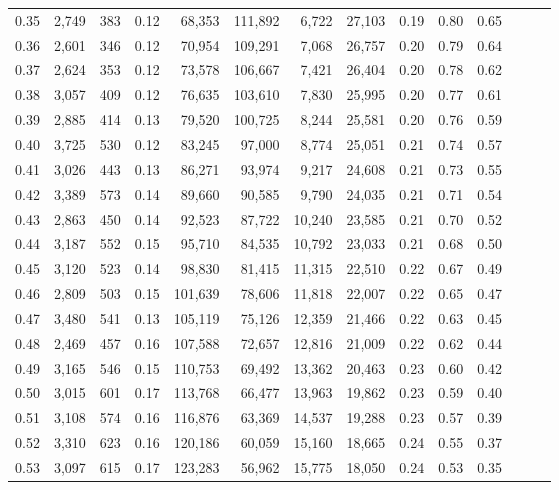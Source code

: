 \begin{tabular}{rrrrrrrrrrrrrr}
0.35 &  2,749 &  383 &  0.12 &   68,353 &  111,892 &   6,722 &  27,103 &  0.19 &  0.80 &      0.65 \\
0.36 &  2,601 &  346 &  0.12 &   70,954 &  109,291 &   7,068 &  26,757 &  0.20 &  0.79 &      0.64 \\
0.37 &  2,624 &  353 &  0.12 &   73,578 &  106,667 &   7,421 &  26,404 &  0.20 &  0.78 &      0.62 \\
0.38 &  3,057 &  409 &  0.12 &   76,635 &  103,610 &   7,830 &  25,995 &  0.20 &  0.77 &      0.61 \\
0.39 &  2,885 &  414 &  0.13 &   79,520 &  100,725 &   8,244 &  25,581 &  0.20 &  0.76 &      0.59 \\
0.40 &  3,725 &  530 &  0.12 &   83,245 &   97,000 &   8,774 &  25,051 &  0.21 &  0.74 &      0.57 \\
0.41 &  3,026 &  443 &  0.13 &   86,271 &   93,974 &   9,217 &  24,608 &  0.21 &  0.73 &      0.55 \\
0.42 &  3,389 &  573 &  0.14 &   89,660 &   90,585 &   9,790 &  24,035 &  0.21 &  0.71 &      0.54 \\
0.43 &  2,863 &  450 &  0.14 &   92,523 &   87,722 &  10,240 &  23,585 &  0.21 &  0.70 &      0.52 \\
0.44 &  3,187 &  552 &  0.15 &   95,710 &   84,535 &  10,792 &  23,033 &  0.21 &  0.68 &      0.50 \\
0.45 &  3,120 &  523 &  0.14 &   98,830 &   81,415 &  11,315 &  22,510 &  0.22 &  0.67 &      0.49 \\
0.46 &  2,809 &  503 &  0.15 &  101,639 &   78,606 &  11,818 &  22,007 &  0.22 &  0.65 &      0.47 \\
0.47 &  3,480 &  541 &  0.13 &  105,119 &   75,126 &  12,359 &  21,466 &  0.22 &  0.63 &      0.45 \\
0.48 &  2,469 &  457 &  0.16 &  107,588 &   72,657 &  12,816 &  21,009 &  0.22 &  0.62 &      0.44 \\
0.49 &  3,165 &  546 &  0.15 &  110,753 &   69,492 &  13,362 &  20,463 &  0.23 &  0.60 &      0.42 \\
0.50 &  3,015 &  601 &  0.17 &  113,768 &   66,477 &  13,963 &  19,862 &  0.23 &  0.59 &      0.40 \\
0.51 &  3,108 &  574 &  0.16 &  116,876 &   63,369 &  14,537 &  19,288 &  0.23 &  0.57 &      0.39 \\
0.52 &  3,310 &  623 &  0.16 &  120,186 &   60,059 &  15,160 &  18,665 &  0.24 &  0.55 &      0.37 \\
0.53 &  3,097 &  615 &  0.17 &  123,283 &   56,962 &  15,775 &  18,050 &  0.24 &  0.53 &      0.35 \\

\end{tabular}
